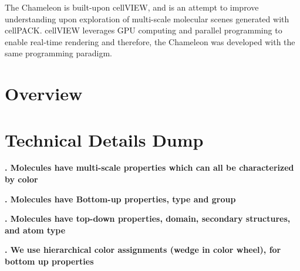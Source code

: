 \documentclass[review,journal]{vgtc}         %
\begin{document}
The Chameleon is built-upon cellVIEW, and is an attempt to improve understanding upon exploration of multi-scale molecular scenes generated with cellPACK.
cellVIEW leverages GPU computing and parallel programming to enable real-time rendering and therefore, the Chameleon was developed with the same programming paradigm.


\section{Overview}

\section{Technical Details Dump}

\textbf{. Molecules have multi-scale properties which can all be characterized by color }


\textbf{. Molecules have Bottom-up properties, type and group}


\textbf{. Molecules have top-down properties, domain, secondary structures, and atom type}


\textbf{. We use hierarchical color assignments (wedge in color wheel), for bottom up properties}

\end{document}
